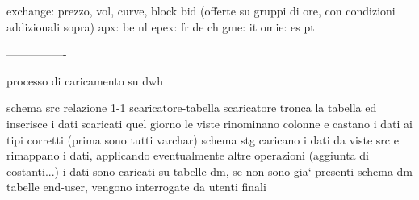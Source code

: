   exchange: prezzo, vol, curve, block bid (offerte su gruppi di ore, con condizioni addizionali sopra)
  apx: be nl
  epex: fr de ch 
  gme: it
  omie: es pt
  
  
  
  
  ----------------
  
  processo di caricamento su dwh
    
    schema src
        relazione 1-1 scaricatore-tabella
        scaricatore tronca la tabella ed inserisce i dati scaricati quel giorno
        le viste rinominano colonne e castano i dati ai tipi corretti (prima sono tutti varchar)
    schema stg
        caricano i dati da viste src e rimappano i dati, applicando eventualmente altre operazioni (aggiunta di costanti...)
        i dati sono caricati su tabelle dm, se non sono gia` presenti
    schema dm
        tabelle end-user, vengono interrogate da utenti finali